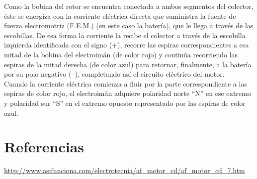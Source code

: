 \documentclass[10pt,a4paper]{article}
\begin{document}
Como la bobina del rotor se encuentra conectada a ambos segmentos del colector, éste se energiza con la corriente eléctrica directa que suministra la fuente de fuerza electromotriz (F.E.M.) (en este caso la batería), que le llega a través de las escobillas. De esa forma la corriente la recibe el colector a través de la escobilla izquierda identificada con el signo (+), recorre las espiras correspondientes a esa mitad de la bobina del electroimán (de color rojo) y continúa recorriendo las espiras de la mitad derecha (de color azul) para retornar, finalmente, a la batería por su polo negativo (–), completando así el circuito eléctrico del motor.\\

Cuando la corriente eléctrica comienza a fluir por la parte correspondiente a las espiras de color rojo, el electroimán adquiere polaridad norte “N” en ese extremo y polaridad sur “S” en el extremo opuesto representado por las espiras de color azul.\\
\section{Referencias }
\url{http://www.asifunciona.com/electrotecnia/af_motor_cd/af_motor_cd_7.htm}
\end{document}
